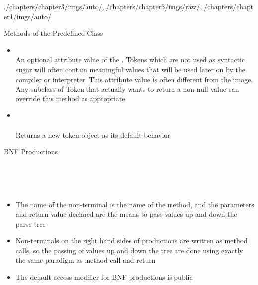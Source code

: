\begin{graphicspathcontext}{{./chapters/chapter3/imgs/auto/},{./chapters/chapter3/imgs/raw/},{./chapters/chapter1/imgs/auto/}}
\begin{bibunit}[apalike]
\begin{frame}{Methods of the Predefined  Class}
	\begin{itemize}
	\item {} \\
		An optional attribute value of the . Tokens which are not used as syntactic sugar will often contain meaningful values that will be used later on by the compiler or interpreter. This attribute value is often different from the image. Any subclass of Token that actually wants to return a non-null value can override this method as appropriate
	\vfill
	\item {} \\
		 \\
		Returns a new token object as its default behavior
	\end{itemize}
\end{frame}

\begin{frame}[t]{BNF Productions}
	\begin{definition}\small
		 \\
		 \\
		 \\
	\end{definition}
	\begin{itemize}
	\item The name of the non-terminal is the name of the method, and the parameters and return value declared are the means to pass values up and down the parse tree
	\item Non-terminals on the right hand sides of productions are written as method calls, so the passing of values up and down the tree are done using exactly the same paradigm as method call and return
	\item The default access modifier for BNF productions is public
	\end{itemize}
\end{frame}


\end{bibunit}
\end{graphicspathcontext}
